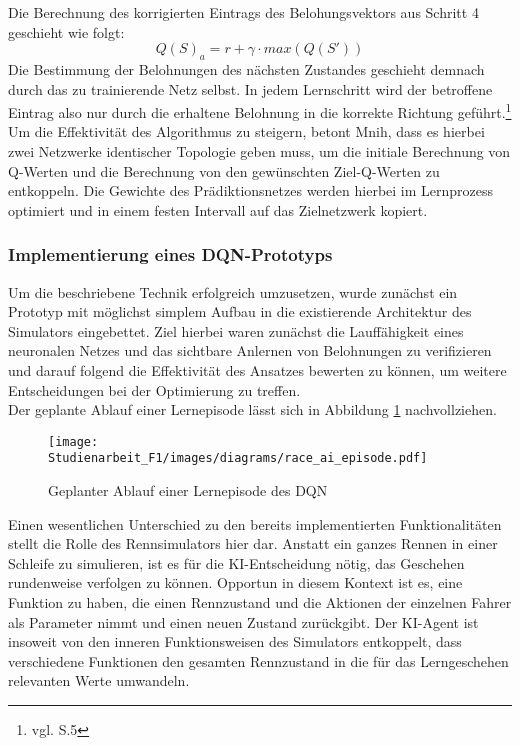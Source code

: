 Die Berechnung des korrigierten Eintrags des Belohungsvektors aus Schritt 4 geschieht wie folgt: 
\[Q(S)_a = r + \gamma \cdot max(Q(S'))\]
Die Bestimmung der Belohnungen des nächsten Zustandes geschieht demnach durch das zu trainierende Netz selbst. In jedem Lernschritt wird der betroffene Eintrag also nur durch die erhaltene Belohnung in die korrekte Richtung geführt.\footnote{vgl. \cite{atari_deep_reinforcement_learning} S.5} Um die Effektivität des Algorithmus zu steigern, betont Mnih, dass es hierbei zwei Netzwerke identischer Topologie geben muss, um die initiale Berechnung von Q-Werten und die Berechnung von den gewünschten Ziel-Q-Werten zu entkoppeln. Die Gewichte des Prädiktionsnetzes werden hierbei im Lernprozess optimiert und in einem festen Intervall auf das Zielnetzwerk kopiert.

\subsubsection{Implementierung eines DQN-Prototyps}
Um die beschriebene Technik erfolgreich umzusetzen, wurde zunächst ein Prototyp mit möglichst simplem Aufbau in die existierende Architektur des Simulators eingebettet. Ziel hierbei waren zunächst die Lauffähigkeit eines neuronalen Netzes und das sichtbare Anlernen von Belohnungen zu verifizieren und darauf folgend die Effektivität des Ansatzes bewerten zu können, um weitere Entscheidungen bei der Optimierung zu treffen.\\
Der geplante Ablauf einer Lernepisode lässt sich in Abbildung \ref{fig:race_ai_learning_episode} nachvollziehen.
\begin{figure}[ht]
    \begin{center}
        \texttt{[image: Studienarbeit\_F1/images/diagrams/race\_ai\_episode.pdf]}
    \end{center}
    \caption{Geplanter Ablauf einer Lernepisode des DQN}
    \label{fig:race_ai_learning_episode}
\end{figure}
Einen wesentlichen Unterschied zu den bereits implementierten Funktionalitäten stellt die Rolle des Rennsimulators hier dar. Anstatt ein ganzes Rennen in einer Schleife zu simulieren, ist es für die KI-Entscheidung nötig, das Geschehen rundenweise verfolgen zu können. Opportun in diesem Kontext ist es, eine Funktion zu haben, die einen Rennzustand und die Aktionen der einzelnen Fahrer als Parameter nimmt und einen neuen Zustand zurückgibt. Der KI-Agent ist insoweit von den inneren Funktionsweisen des Simulators entkoppelt, dass verschiedene Funktionen den gesamten Rennzustand in die für das Lerngeschehen relevanten Werte umwandeln.
